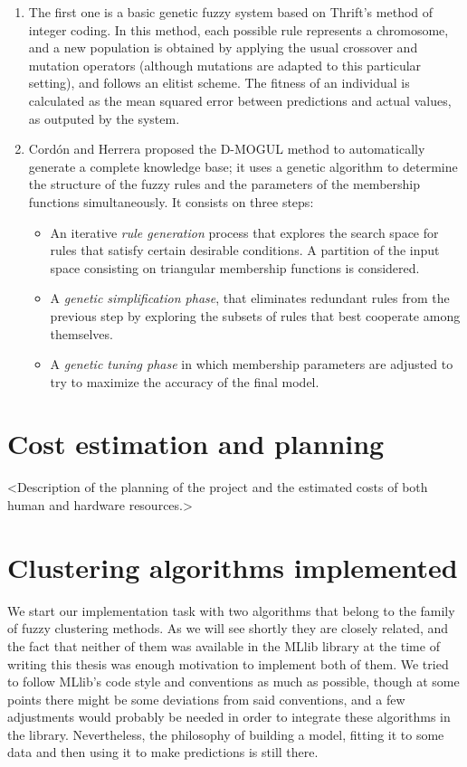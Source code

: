 \begin{enumerate}[1.]
  \item The first one is a basic genetic fuzzy system based on Thrift's method \cite{thrift1991genetic} of integer coding. In this method, each possible rule represents a chromosome, and a new population is obtained by applying the usual crossover and mutation operators (although mutations are adapted to this particular setting), and follows an elitist scheme. The fitness of an individual is calculated as the mean squared error between predictions and actual values, as outputed by the system.
  \item Cordón and Herrera proposed the D-MOGUL method \cite{cordon1997three} to automatically generate a complete knowledge base; it uses a genetic algorithm to determine the structure of the fuzzy rules and the parameters of the membership functions simultaneously. It consists on three steps:
  \begin{itemize}
    \item An iterative \textit{rule generation} process that explores the search space for rules that satisfy certain desirable conditions. A partition of the input space consisting on triangular membership functions is considered.
    \item A \textit{genetic simplification phase}, that eliminates redundant rules from the previous step by exploring the subsets of rules that best cooperate among themselves.
    \item A \textit{genetic tuning phase} in which membership parameters are adjusted to try to maximize the accuracy of the final model.
  \end{itemize}
\end{enumerate}

\section{Cost estimation and planning}

<Description of the planning of the project and the estimated costs of both human and hardware resources.>

\section{Clustering algorithms implemented}

We start our implementation task with two algorithms that belong to the family of fuzzy clustering methods. As we will see shortly they are closely related, and the fact that neither of them was available in the MLlib library at the time of writing this thesis was enough motivation to implement both of them. We tried to follow MLlib's code style and conventions as much as possible, though at some points there might be some deviations from said conventions, and a few adjustments would probably be needed in order to integrate these algorithms in the library. Nevertheless, the philosophy of building a model, fitting it to some data and then using it to make predictions is still there.

